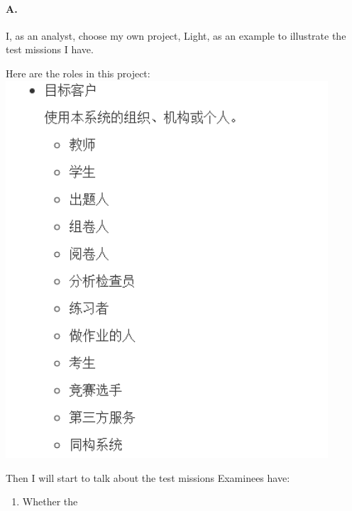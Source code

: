 \paragraph{A.}
I, as an analyst, choose my own project, Light, as an example to illustrate the test missions I have.

Here are the roles in this project:
\includegraphics[width=0.9\textwidth]{1.png}

Then I will start to talk about the test missions Examinees have:

\begin{enumerate}
	\item Whether the 
\end{enumerate}